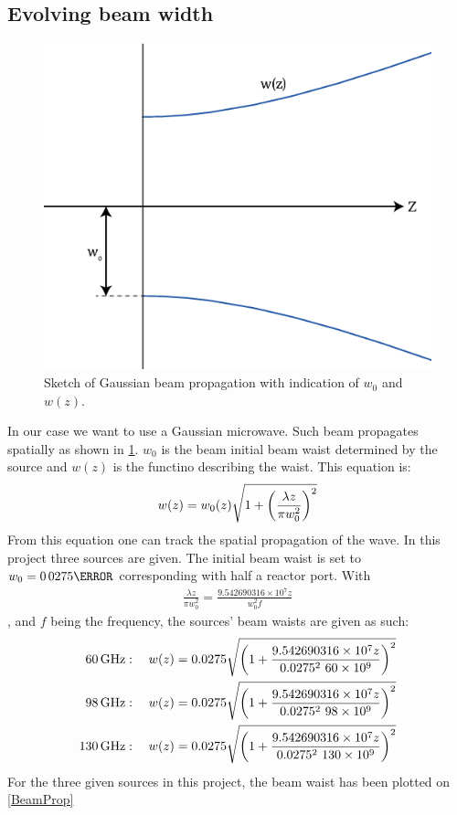 \subsection{Evolving beam width}
\begin{figure}
	\vspace{-5mm}
	\includegraphics[width=.4\textwidth]{Figures/PropEx.eps}
	\caption{Sketch of Gaussian beam propagation with indication of \(w_0\) and \(w(z)\).}
	\label{PropEx}
\end{figure}
In our case we want to use a Gaussian microwave. Such beam propagates spatially as shown in \cref{PropEx}.
\(w_0\) is the beam initial beam waist determined by the source and \(w(z)\) is the functino describing the waist. This equation is:
\begin{align}
	w(z) = w_0(z)\sqrt{1+\pqty{\frac{\lambda z}{\pi w_0^2}}^2}\label{wz}
\end{align}
From this equation one can track the spatial propagation of the wave. In this project three sources are given. The initial beam waist is set to \(w_0=\si{0.0275}{\meter}\) corresponding with half a reactor port. With
\begin{align}
	\frac{\lambda z}{\pi w_0^2} = \frac{9.542690316\times10^7 z}{w_0^2 f}
\end{align}
, and \(f\) being the frequency, the sources' beam waists are given as such:
\begin{align}
	\SI{60}{\giga\hertz}  & : \quad w(z)=0.0275\sqrt{\pqty{1+\frac{9.542690316\times10^7 z}{0.0275^2 \ 60\times10^9}}^2}\label{60}   \\
	\SI{98}{\giga\hertz}  & : \quad w(z)=0.0275\sqrt{\pqty{1+\frac{9.542690316\times10^7 z}{0.0275^2 \ 98\times10^9}}^2}\label{98}   \\
	\SI{130}{\giga\hertz} & : \quad w(z)=0.0275\sqrt{\pqty{1+\frac{9.542690316\times10^7 z}{0.0275^2 \ 130\times10^9}}^2}\label{130}
\end{align}
For the three given sources in this project, the beam waist has been plotted on \cref{BeamProp}
